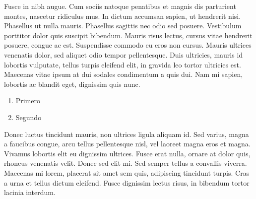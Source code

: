 \documentclass[a4paper, 11pt]{article} %
\begin{document}
Fusce in nibh augue. Cum sociis natoque penatibus et magnis dis parturient montes, nascetur ridiculus mus. In dictum accumsan sapien, ut hendrerit nisi. Phasellus ut nulla mauris. Phasellus sagittis nec odio sed posuere. Vestibulum porttitor dolor quis suscipit bibendum. Mauris risus lectus, cursus vitae hendrerit posuere, congue ac est. Suspendisse commodo eu eros non cursus. Mauris ultrices venenatis dolor, sed aliquet odio tempor pellentesque. Duis ultricies, mauris id lobortis vulputate, tellus turpis eleifend elit, in gravida leo tortor ultricies est. Maecenas vitae ipsum at dui sodales condimentum a quis dui. Nam mi sapien, lobortis ac blandit eget, dignissim quis nunc.

\begin{enumerate}
\item Primero
\item Segundo
\end{enumerate}

Donec luctus tincidunt mauris, non ultrices ligula aliquam id. Sed varius, magna a faucibus congue, arcu tellus pellentesque nisl, vel laoreet magna eros et magna. Vivamus lobortis elit eu dignissim ultrices. Fusce erat nulla, ornare at dolor quis, rhoncus venenatis velit. Donec sed elit mi. Sed semper tellus a convallis viverra. Maecenas mi lorem, placerat sit amet sem quis, adipiscing tincidunt turpis. Cras a urna et tellus dictum eleifend. Fusce dignissim lectus risus, in bibendum tortor lacinia interdum.


\nocite{*} %
\printbibliography[title=Bibliografía]
\end{document}
